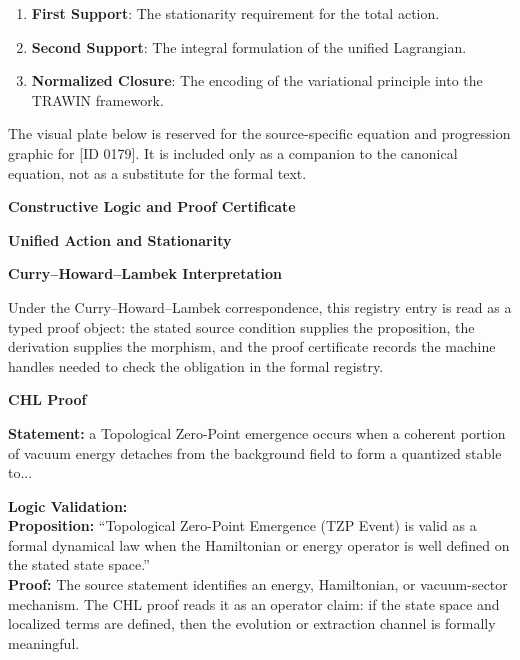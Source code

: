 \begin{enumerate}[leftmargin=1.6em,itemsep=6pt,topsep=4pt]
\item \textbf{First Support}: The stationarity requirement for the total action.
\item \textbf{Second Support}: The integral formulation of the unified Lagrangian.
\item \textbf{Normalized Closure}: The encoding of the variational principle into the TRAWIN framework.
\end{enumerate}

\begingroup\footnotesize\sloppy
The visual plate below is reserved for the source-specific equation and progression graphic for [ID 0179]. It is included only as a companion to the canonical equation, not as a substitute for the formal text.
\par\endgroup
\ifTZPDarkEdition
{}
\fi

\clearpage
\begingroup\tzpsupportsetup
\noindent\textbf{\fontsize{10.8pt}{12.8pt}\selectfont [ID 0179] Constructive Logic and Proof Certificate}\par
\noindent\textbf{\fontsize{10pt}{12pt}\selectfont Unified Action and Stationarity}\par
\vspace{0.45em}
\begingroup
\footnotesize
\setlength{\parskip}{0.22em}
\setlength{\parindent}{0pt}
\noindent\textbf{Curry--Howard--Lambek Interpretation}\par
Under the Curry--Howard--Lambek correspondence, this registry entry is read as a typed proof
object: the stated source condition supplies the proposition, the derivation supplies the
morphism, and the proof certificate records the machine handles needed to check the obligation
in the formal registry.

\vspace{0.45em}
\noindent\textbf{CHL Proof}\par
\textbf{Statement:} a Topological Zero-Point emergence occurs when a coherent portion of vacuum energy
detaches from the background field to form a quantized stable to...

\textbf{Logic Validation:}\\
\textbf{Proposition:} ``Topological Zero-Point Emergence (TZP Event) is valid as a formal dynamical law when the
Hamiltonian or energy operator is well defined on the stated state space.''\\
\textbf{Proof:} The source statement identifies an energy, Hamiltonian, or vacuum-sector mechanism. The
CHL proof reads it as an operator claim: if the state space and localized terms are
defined, then the evolution or extraction channel is formally meaningful.

